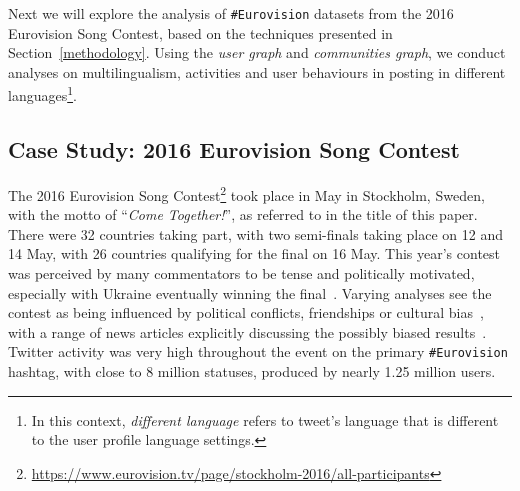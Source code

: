 \documentclass{llncs}
\begin{document}

Next we will explore the analysis of {\texttt{\#Eurovision}} datasets
from the 2016 Eurovision Song Contest, based on the techniques
presented in Section~\ref{methodology}. Using the \emph{user graph}
and \emph{communities graph}, we conduct analyses on multilingualism,
activities and user behaviours in posting in different
languages\footnote{In this context, \emph{different language} refers
to tweet's language that is different to the user profile language
settings.}.

\subsection{Case Study: 2016 Eurovision Song Contest}\label{context}

The 2016 Eurovision Song
Contest\footnote{\url{https://www.eurovision.tv/page/stockholm-2016/all-participants}}
took place in May in Stockholm, Sweden, with the motto of
``{\emph{Come Together!}}'', as referred to in the title of this
paper. There were 32 countries taking part, with two semi-finals
taking place on 12 and 14 May, with 26 countries qualifying for the
final on 16 May. This year's contest was perceived by many
commentators to be tense and politically motivated, especially with
Ukraine eventually winning the
final~\cite{telegrapheuroboycott:2016}. Varying analyses see the
contest as being influenced by political conflicts, friendships or
cultural
bias~\cite{ginsburgh+noury:2008,charron:2013,blangiardo+baio:2014,budzinski+pannicke:2016},
with a range of news articles explicitly discussing the possibly
biased results~\cite{telegrapheurobias:2016}.  Twitter activity was
very high throughout the event on the primary {\texttt{\#Eurovision}}
hashtag, with close to 8 million statuses, produced by nearly 1.25
million users.
\end{document}
